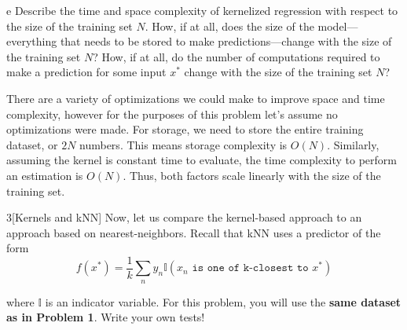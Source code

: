 \documentclass[expanded]{lkx_pset}
\begin{document}
\begin{parts}
	\begin{part}{e}
		Describe the time and space complexity of kernelized regression with respect to the size of the training set $N$.
		How, if at all, does the size of the model---everything that needs to be stored to make predictions---change with the size of the training set $N$?
		How, if at all, do the number of computations required to make a prediction for some input $x^*$ change with the size of the training set $N$?
	\end{part}

	There are a variety of optimizations we could make to improve space and time complexity, however for the purposes of this problem let's assume no optimizations were made. For storage, we need to store the entire training dataset, or $2N$ numbers. This means storage complexity is $O(N)$. Similarly, assuming the kernel is constant time to evaluate, the time complexity to perform an estimation is $O(N)$. Thus, both factors scale linearly with the size of the training set.
\end{parts}

\begin{problem}{3}[Kernels and kNN]
Now, let us compare the kernel-based approach to an approach based on
nearest-neighbors.  Recall that kNN uses a predictor of the form
\begin{equation*}
	f(x^*) = \frac{1}{k} \sum_n y_n \mathbb{I}(x_n \texttt{ is one of k-closest to } x^*)
\end{equation*}

\noindent where $\mathbb{I}$ is an indicator variable. For this problem, you will use the \textbf{same dataset as in Problem 1}. Write your own tests!
\end{problem}
\end{document}

